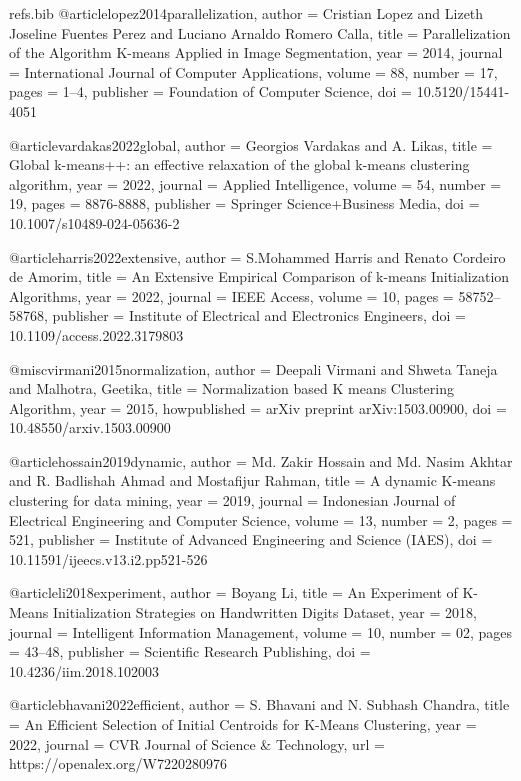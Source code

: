 \begin{filecontents*}[overwrite]{refs.bib}
@article{lopez2014parallelization,
  author = {Cristian Lopez and Lizeth Joseline Fuentes Perez and Luciano Arnaldo Romero Calla},
  title = {{Parallelization of the Algorithm K-means Applied in Image Segmentation}},
  year = {2014},
  journal = {International Journal of Computer Applications},
  volume = {88},
  number = {17},
  pages = {1--4},
  publisher = {Foundation of Computer Science},
  doi = {10.5120/15441-4051}
}

@article{vardakas2022global,
  author = {Georgios Vardakas and A. Likas},
  title = {{Global k-means++: an effective relaxation of the global k-means clustering algorithm}},
  year = {2022},
  journal = {Applied Intelligence},
  volume = {54},
  number = {19},
  pages = {8876-8888},
  publisher = {Springer Science+Business Media},
  doi = {10.1007/s10489-024-05636-2}
}

@article{harris2022extensive,
  author = {S.Mohammed Harris and Renato Cordeiro de Amorim},
  title = {{An Extensive Empirical Comparison of k-means Initialization Algorithms}},
  year = {2022},
  journal = {IEEE Access},
  volume = {10},
  pages = {58752--58768},
  publisher = {Institute of Electrical and Electronics Engineers},
  doi = {10.1109/access.2022.3179803}
}

@misc{virmani2015normalization,
  author = {Deepali Virmani and Shweta Taneja and Malhotra, Geetika},
  title = {{Normalization based K means Clustering Algorithm}},
  year = {2015},
  howpublished = {arXiv preprint arXiv:1503.00900},
  doi = {10.48550/arxiv.1503.00900}
}

@article{hossain2019dynamic,
  author = {Md. Zakir Hossain and Md. Nasim Akhtar and R. Badlishah Ahmad and Mostafijur Rahman},
  title = {{A dynamic K-means clustering for data mining}},
  year = {2019},
  journal = {Indonesian Journal of Electrical Engineering and Computer Science},
  volume = {13},
  number = {2},
  pages = {521},
  publisher = {Institute of Advanced Engineering and Science (IAES)},
  doi = {10.11591/ijeecs.v13.i2.pp521-526}
}

@article{li2018experiment,
  author = {Boyang Li},
  title = {{An Experiment of K-Means Initialization Strategies on Handwritten Digits Dataset}},
  year = {2018},
  journal = {Intelligent Information Management},
  volume = {10},
  number = {02},
  pages = {43--48},
  publisher = {Scientific Research Publishing},
  doi = {10.4236/iim.2018.102003}
}

@article{bhavani2022efficient,
  author = {S. Bhavani and N. Subhash Chandra},
  title = {{An Efficient Selection of Initial Centroids for K-Means Clustering}},
  year = {2022},
  journal = {CVR Journal of Science \& Technology},
  url = {https://openalex.org/W7220280976}
}


\end{filecontents*}
